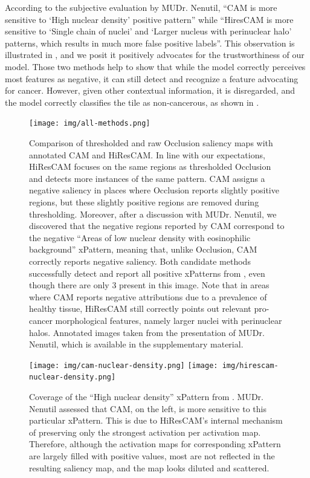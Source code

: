 According to the subjective evaluation by MUDr. Nenutil, ``CAM is more sensitive to `High nuclear density' positive pattern'' while ``HiresCAM is more sensitive to `Single chain of nuclei' and `Larger nucleus with perinuclear halo' patterns, which results in much more false positive labels''.
This observation is illustrated in , and we posit it positively advocates for the trustworthiness of our model. 
Those two methods help to show that while the model correctly perceives most features as negative, it can still detect and recognize a feature advocating for cancer.
However, given other contextual information, it is disregarded, and the model correctly classifies the tile as non-cancerous, as shown in .

\begin{figure}
    \centering
    \texttt{[image: img/all-methods.png]}
    \caption{
    Comparison of thresholded and raw Occlusion saliency maps with annotated CAM and HiResCAM.
    In line with our expectations, HiResCAM focuses on the same regions as thresholded Occlusion and detects more instances of the same pattern.
    CAM assigns a negative saliency in places where Occlusion reports slightly positive regions, but these slightly positive regions are removed during thresholding.
    Moreover, after a discussion with MUDr. Nenutil, we discovered that the negative regions reported by CAM correspond to the negative ``Areas of low nuclear density with eosinophilic background'' xPattern, meaning that, unlike Occlusion, CAM correctly reports negative saliency.
    Both candidate methods successfully detect and report all positive xPatterns from \cite{gallo}, even though there are only $3$ present in this image.
    Note that in areas where CAM reports negative attributions due to a prevalence of healthy tissue, HiResCAM still correctly points out relevant pro-cancer morphological features, namely larger nuclei with perinuclear halos.
    Annotated images taken from the presentation of MUDr. Nenutil, which is available in the supplementary material.
    }
    \label{fig:both-pos}
\end{figure}

\begin{figure}
    \begin{center}
    \begin{minipage}{1\textwidth}
      {\texttt{[image: img/cam-nuclear-density.png]}
      \texttt{[image: img/hirescam-nuclear-density.png]}}
    \end{minipage}
    \caption{
    Coverage of the ``High nuclear density'' xPattern from \cite{gallo}.
    MUDr. Nenutil assessed that CAM, on the left, is more sensitive to this particular xPattern.
    This is due to HiResCAM's internal mechanism of preserving only the strongest activation per activation map.
    Therefore, although the activation maps for corresponding xPattern are largely filled with positive values, most are not reflected in the resulting saliency map, and the map looks diluted and scattered.
    }
    \label{fig:both-nuclear-density}
    \end{center}
\end{figure}

